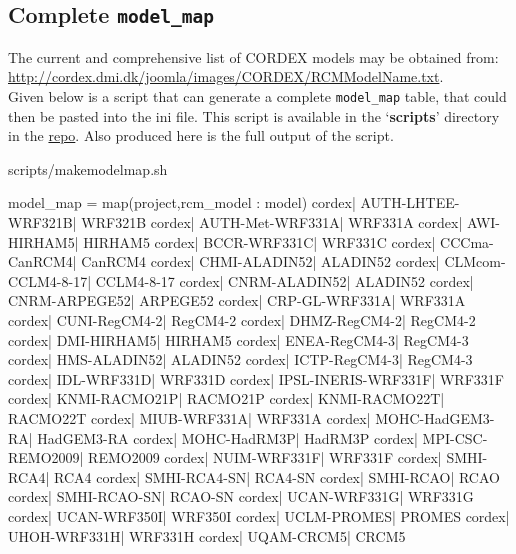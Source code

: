 \subsection{Complete \texttt{model\_map}}
The current and comprehensive list of CORDEX models may be obtained from:\\
\url{http://cordex.dmi.dk/joomla/images/CORDEX/RCMModelName.txt}. \\
Given below is a script that can generate a complete \texttt{model\_map} table, that could then be pasted into the ini file. This script is available in the `\textbf{scripts}' directory in the \href{https://github.com/snic-nsc/datanode-mgr-doc.git}{repo}. Also produced here is the full output of the script. 
\begin{tiny}
\begin{verbatimtabinput}[4]{scripts/makemodelmap.sh}
\end{verbatimtabinput}
\vspace{-8mm}
\begin{verbatimtab}[4]
model_map = map(project,rcm_model : model)
        cordex| AUTH-LHTEE-WRF321B| WRF321B
        cordex| AUTH-Met-WRF331A| WRF331A
        cordex| AWI-HIRHAM5| HIRHAM5
        cordex| BCCR-WRF331C| WRF331C
        cordex| CCCma-CanRCM4| CanRCM4
        cordex| CHMI-ALADIN52| ALADIN52
        cordex| CLMcom-CCLM4-8-17| CCLM4-8-17
        cordex| CNRM-ALADIN52| ALADIN52
        cordex| CNRM-ARPEGE52| ARPEGE52
        cordex| CRP-GL-WRF331A| WRF331A
        cordex| CUNI-RegCM4-2| RegCM4-2
        cordex| DHMZ-RegCM4-2| RegCM4-2
        cordex| DMI-HIRHAM5| HIRHAM5
        cordex| ENEA-RegCM4-3| RegCM4-3
        cordex| HMS-ALADIN52| ALADIN52
        cordex| ICTP-RegCM4-3| RegCM4-3
        cordex| IDL-WRF331D| WRF331D
        cordex| IPSL-INERIS-WRF331F| WRF331F
        cordex| KNMI-RACMO21P| RACMO21P
        cordex| KNMI-RACMO22T| RACMO22T
        cordex| MIUB-WRF331A| WRF331A
        cordex| MOHC-HadGEM3-RA| HadGEM3-RA
        cordex| MOHC-HadRM3P| HadRM3P
        cordex| MPI-CSC-REMO2009| REMO2009
        cordex| NUIM-WRF331F| WRF331F
        cordex| SMHI-RCA4| RCA4
        cordex| SMHI-RCA4-SN| RCA4-SN
        cordex| SMHI-RCAO| RCAO
        cordex| SMHI-RCAO-SN| RCAO-SN
        cordex| UCAN-WRF331G| WRF331G
        cordex| UCAN-WRF350I| WRF350I
        cordex| UCLM-PROMES| PROMES
        cordex| UHOH-WRF331H| WRF331H
        cordex| UQAM-CRCM5| CRCM5
\end{verbatimtab}
\end{tiny}

